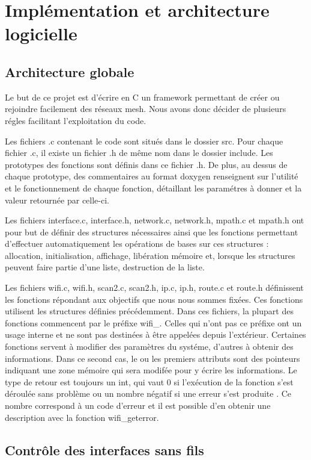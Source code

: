 \chapter{Implémentation et architecture logicielle}
\section{Architecture globale}

Le but de ce projet est d'écrire en C un framework permettant de créer ou rejoindre facilement des réseaux mesh. Nous avons donc
décider de plusieurs régles facilitant l'exploitation du code.

Les fichiers .c contenant le code sont situés dans le dossier src. Pour chaque fichier .c, il existe un fichier .h de même nom dans
le dossier include. Les prototypes des fonctions sont définis dans ce fichier .h. De plus, au dessus de chaque prototype, des 
commentaires au format doxygen renseignent sur l'utilité et le fonctionnement de chaque fonction, détaillant les paramétres
à donner et la valeur retournée par celle-ci. 

Les fichiers interface.c, interface.h, network.c, network.h, mpath.c et mpath.h ont pour but de définir des structures 
nécessaires ainsi que les fonctions permettant d'effectuer automatiquement les opérations de bases sur ces structures : allocation, 
initialisation, affichage, libération mémoire et, lorsque les structures peuvent faire partie d'une liste, destruction de la liste.

Les fichiers wifi.c, wifi.h, scan2.c, scan2.h, ip.c, ip.h, route.c et route.h définissent les fonctions répondant aux objectifs que
nous nous sommes fixées. Ces fonctions utilisent les structures définies précédemment. Dans ces fichiers, la plupart des fonctions
commencent par le préfixe wifi\_\-. Celles qui n'ont pas ce préfixe ont un usage interne et ne sont pas destinées à être appelées depuis
l'extérieur. Certaines fonctions servent à modifier des paramètres du systéme, d'autres à obtenir des informations. Dans ce 
second cas, le ou les premiers attributs sont des pointeurs indiquant une zone mémoire qui sera modifée pour y écrire les informations.
Le type de retour est toujours un int, qui vaut 0 si l'exécution de la fonction s'est déroulée sans problème ou un nombre négatif
si une erreur  s'est produite . Ce nombre correspond à un code d'erreur et il est possible d'en obtenir une description avec 
la fonction wifi\_\-geterror.

\section{Contrôle des interfaces sans fils}

